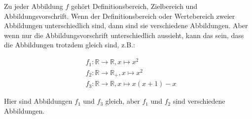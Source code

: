 \documentclass[12pt,a4paper,oneside]{article}
\newcommand{\emptyline}{\hspace*{\fill}}
\newcommand{\R}{\mathbb{R}}
\begin{document}
        \emptyline

        Zu jeder Abbildung $f$ gehört Definitionsbereich, Zielbereich und Abbildungsvorschrift.
        Wenn der Definitionsbereich oder Wertebereich zweier Abbildungen unterschiedlich sind, dann sind sie verschiedene Abbildungen.
        Aber wenn nur die Abbildungsvorschrift unterschiedlich aussieht, kann das sein, dass die Abbildungen trotzdem gleich sind, z.B.:

        \vspace{-1em}
        \begin{align*}
            &f_1: \R \to \R, x \mapsto x^2 \\
            &f_2: \R \to \R_+, x \mapsto x^2 \\
            &f_3: \R \to \R, x \mapsto x(x + 1) - x
        \end{align*}

        Hier sind Abbildungen $f_1$ und $f_3$ gleich, aber $f_1$ und $f_2$ sind verschiedene Abbildungen.
\end{document}
